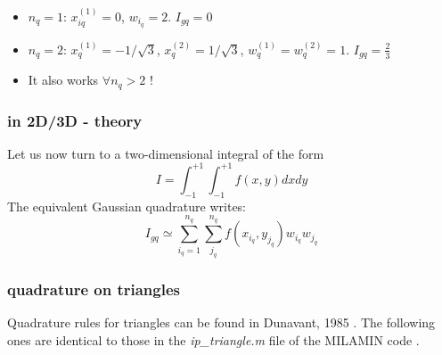 \begin{itemize}
\item $n_q=1$: $x_{iq}^{(1)}=0$, $w_{i_q}=2$. $I_{gq}=0$
\item $n_q=2$: $x_{q}^{(1)}=-1/\sqrt{3}$, $x_{q}^{(2)}=1/\sqrt{3}$, $w_{q}^{(1)}=w_{q}^{(2)}=1$. $I_{gq}=\frac{2}{3}$
\item It also works $\forall n_q>2$ !
\end{itemize}

\subsubsection{in 2D/3D - theory}


Let us now turn to a two-dimensional integral of the form
\[
I=\int_{-1}^{+1} \int_{-1}^{+1} f(x,y) dx dy
\]
The equivalent Gaussian quadrature writes:
\[
I_{gq}
\simeq \sum_{i_q=1}^{n_q}\sum_{j_q}^{n_q} f(x_{i_q},y_{j_q}) w_{i_q} w_{j_q}
\]

\subsubsection{quadrature on triangles}

Quadrature rules for triangles can be found in Dunavant, 1985 \cite{duna85}.
The following ones are identical to those in the {\sl ip\_triangle.m} 
file of the MILAMIN code \cite{daks08}.

